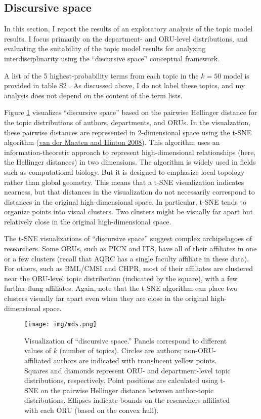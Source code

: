 \documentclass[
  11pt,
]{article}
\begin{document}
\hypertarget{discursive-space}{%
\subsection{Discursive space}\label{discursive-space}}

In this section, I report the results of an exploratory analysis of the topic model results. I focus primarily on the department- and ORU-level distributions, and evaluating the suitability of the topic model results for analyzing interdisciplinarity using the ``discursive space'' conceptual framework.

A list of the 5 highest-probability terms from each topic in the \(k=50\) model is provided in table S2 . As discussed above, I do not label these topics, and my analysis does not depend on the content of the term lists.

Figure \ref{fig.mds} visualizes ``discursive space'' based on the pairwise Hellinger distance for the topic distributions of authors, departments, and ORUs. In the visualzation, these pairwise distances are represented in 2-dimensional space using the t-SNE algorithm (\protect\hyperlink{ref-vanderMaatenVisualizingDataUsing2008}{van der Maaten and Hinton 2008}). This algorithm uses an information-theoretic approach to represent high-dimensional relationships (here, the Hellinger distances) in two dimensions. The algorithm is widely used in fields such as computational biology. But it is designed to emphasize local topology rather than global geometry. This means that a t-SNE visualization indicates nearness, but that distances in the visualization do not necessarily correspond to distances in the original high-dimensional space. In particular, t-SNE tends to organize points into visual clusters. Two clusters might be visually far apart but relatively close in the original high-dimensional space.

The t-SNE visualizations of ``discursive space'' suggest complex archipelagoes of researchers. Some ORUs, such as PICN and ITS, have all of their affiliates in one or a few clusters (recall that AQRC has a single faculty affiliate in these data). For others, such as BML/CMSI and CHPR, most of their affiliates are clustered near the ORU-level topic distribution (indicated by the square), with a few further-flung affiliates. Again, note that the t-SNE algorithm can place two clusters visually far apart even when they are close in the original high-dimensional space.

\begin{figure}
\centering
\texttt{[image: img/mds.png]}
\caption{Visualization of ``discursive space.'' Panels correspond to different values of \(k\) (number of topics). Circles are authors; non-ORU-affiliated authors are indicated with translucent yellow points. Squares and diamonds represent ORU- and department-level topic distributions, respectively. Point positions are calculated using t-SNE on the pairwise Hellinger distance between author-topic distributions. Ellipses indicate bounds on the researchers affiliated with each ORU (based on the convex hull). \label{fig.mds}}
\end{figure}
\end{document}
